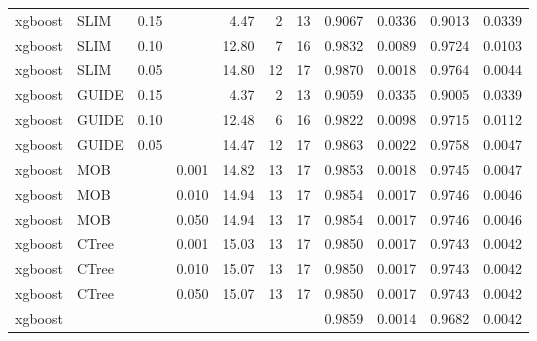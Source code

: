 \begin{table}
\begin{tabular}[t]{l|l|r|r|r|r|r|r|r|r|r}
xgboost & SLIM & 0.15 & & 4.47 & 2 & 13 & 0.9067 & 0.0336 & 0.9013 & 0.0339\\
xgboost & SLIM & 0.10 & & 12.80 & 7 & 16 & 0.9832 & 0.0089 & 0.9724 & 0.0103\\
xgboost & SLIM & 0.05 & & 14.80 & 12 & 17 & 0.9870 & 0.0018 & 0.9764 & 0.0044\\
xgboost & GUIDE & 0.15 & & 4.37 & 2 & 13 & 0.9059 & 0.0335 & 0.9005 & 0.0339\\
xgboost & GUIDE & 0.10 & & 12.48 & 6 & 16 & 0.9822 & 0.0098 & 0.9715 & 0.0112\\
xgboost & GUIDE & 0.05 & & 14.47 & 12 & 17 & 0.9863 & 0.0022 & 0.9758 & 0.0047\\
xgboost & MOB & & 0.001 & 14.82 & 13 & 17 & 0.9853 & 0.0018 & 0.9745 & 0.0047\\
xgboost & MOB & & 0.010 & 14.94 & 13 & 17 & 0.9854 & 0.0017 & 0.9746 & 0.0046\\
xgboost & MOB & & 0.050 & 14.94 & 13 & 17 & 0.9854 & 0.0017 & 0.9746 & 0.0046\\
xgboost & CTree & & 0.001 & 15.03 & 13 & 17 & 0.9850 & 0.0017 & 0.9743 & 0.0042\\
xgboost & CTree & & 0.010 & 15.07 & 13 & 17 & 0.9850 & 0.0017 & 0.9743 & 0.0042\\
xgboost & CTree & & 0.050 & 15.07 & 13 & 17 & 0.9850 & 0.0017 & 0.9743 & 0.0042\\
\hline
xgboost & & & & & & & 0.9859 & 0.0014 & 0.9682 & 0.0042\\
\hline
\end{tabular}
\label{tab:app_linear_mixed_1000}

\end{table}





